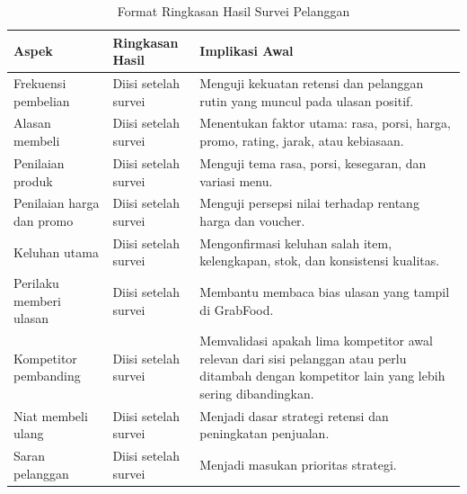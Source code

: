 \begin{table}[!htbp]
    \centering
    \caption{Format Ringkasan Hasil Survei Pelanggan}
    \label{tab:format-ringkasan-survei-pelanggan}
    \footnotesize
    \setlength{\tabcolsep}{4pt}
    \renewcommand{\arraystretch}{0.95}
    \begin{tabularx}{\textwidth}{|Z{3cm}|Y|Y|}
        \toprule
        \textbf{Aspek} & \textbf{Ringkasan Hasil} & \textbf{Implikasi Awal} \\ \hline
        \midrule
        Frekuensi pembelian & Diisi setelah survei & Menguji kekuatan retensi dan pelanggan rutin yang muncul pada ulasan positif. \\ \hline
        Alasan membeli & Diisi setelah survei & Menentukan faktor utama: rasa, porsi, harga, promo, rating, jarak, atau kebiasaan. \\ \hline
        Penilaian produk & Diisi setelah survei & Menguji tema rasa, porsi, kesegaran, dan variasi menu. \\ \hline
        Penilaian harga dan promo & Diisi setelah survei & Menguji persepsi nilai terhadap rentang harga dan voucher. \\ \hline
        Keluhan utama & Diisi setelah survei & Mengonfirmasi keluhan salah item, kelengkapan, stok, dan konsistensi kualitas. \\ \hline
        Perilaku memberi ulasan & Diisi setelah survei & Membantu membaca bias ulasan yang tampil di GrabFood. \\ \hline
        Kompetitor pembanding & Diisi setelah survei & Memvalidasi apakah lima kompetitor awal relevan dari sisi pelanggan atau perlu ditambah dengan kompetitor lain yang lebih sering dibandingkan. \\ \hline
        Niat membeli ulang & Diisi setelah survei & Menjadi dasar strategi retensi dan peningkatan penjualan. \\ \hline
        Saran pelanggan & Diisi setelah survei & Menjadi masukan prioritas strategi. \\ \hline
        \bottomrule
    \end{tabularx}
\end{table}
